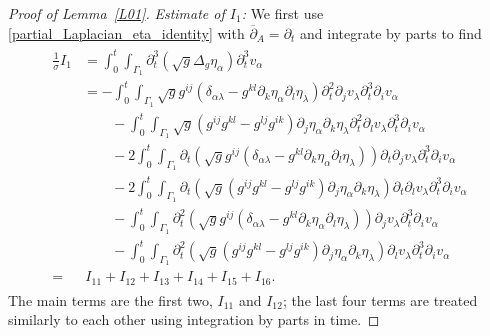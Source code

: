 \documentclass[10pt,reqno]{amsart}
\theoremstyle{plain}
\theoremstyle{definition}
\numberwithin{equation}{section}
\newcommand{\al}{\alpha}
\newcommand{\Ga}{\Gamma}
\newcommand{\de}{\delta}
\newcommand{\la}{\lambda}
\newcommand{\si}{\sigma}
\def\nts#1{{\color{red}\hbox{\bf ~#1~}}} %
\def\indeq{\qquad{}}                     %
\begin{document}
\begin{proof}[Proof of Lemma~\ref{L01}]
\emph{Estimate of $I_1$:}
We first use \eqref{partial_Laplacian_eta_identity}
with $\overline{\partial}_A = \partial_t$ and integrate by parts to find
\begin{align}
\begin{split}
\frac{1}{\si} I_1
&=
\int_0^t \int_{\Ga_1} \partial^3_t(\sqrt{g} \Delta_g \eta_\al ) \partial^3_t v_\al 
\\&
 = 
-\int_0^t \int_{\Ga_1}
\sqrt{g} g^{ij} (\de_{\al\la} -g^{kl} \partial_k \eta_\al \partial_l \eta_\la)
\partial^2_t \partial_j v_\la \partial^3_t \partial_i v_\al
\\
&\indeq
-
\int_0^t \int_{\Ga_1}
 \sqrt{g}(g^{ij} g^{kl} - g^{lj}g^{ik} ) \partial_j \eta_\al \partial_k\eta_\la 
\partial^2_t \partial_l v_\la \partial^3_t \partial_i v_\al
\\&\indeq
- 2\int_0^t \int_{\Ga_1}
\partial_t( \sqrt{g} g^{ij} (\de_{\al\la} -g^{kl} \partial_k \eta_\al \partial_l \eta_\la) )
\partial_t \partial_j v_\la \partial^3_t \partial_i v_\al
\\&\indeq
-2
\int_0^t \int_{\Ga_1}
 \partial_t( \sqrt{g}(g^{ij} g^{kl} - g^{lj}g^{ik} ) \partial_j \eta_\al \partial_k\eta_\la )
\partial_t \partial_l v_\la \partial^3_t \partial_i v_\al 
\\&\indeq
- \int_0^t \int_{\Ga_1}
\partial^2_t( \sqrt{g} g^{ij} (\de_{\al\la} -g^{kl} \partial_k \eta_\al \partial_l \eta_\la) )
\partial_j v_\la \partial^3_t \partial_i v_\al
\\&\indeq
-
\int_0^t \int_{\Ga_1}
 \partial^2_t( \sqrt{g}(g^{ij} g^{kl} - g^{lj}g^{ik} ) \partial_j \eta_\al \partial_k\eta_\la )
\partial_l v_\la \partial^3_t \partial_i v_\al 
\\
= &  \, I_{11} + I_{12} + I_{13} + I_{14} + I_{15} + I_{16}. 
\end{split}
\label{I_1_break_up}
\end{align}
The main terms are the first two, 
$I_{11}$ and $I_{12}$; the last four terms are treated similarly
to each other using
integration by parts in time.


\end{proof}
\end{document}

